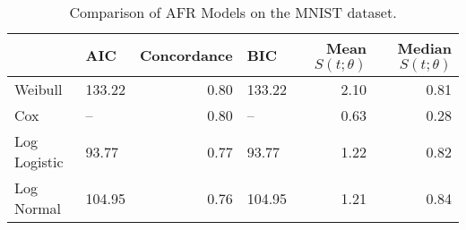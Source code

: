 \begin{table*}\n\centering
\caption{Comparison of AFR Models on the MNIST dataset.}
\label{tab:mnist}
\begin{tabular}{llrlrr}
\toprule
 & AIC & Concordance & BIC & Mean $S(t;\theta)$ & Median $S(t; \theta)$ \\
\midrule
Weibull & 133.22 & 0.80 & 133.22 & 2.10 & 0.81 \\
Cox & -- & 0.80 & -- & 0.63 & 0.28 \\
Log Logistic & 93.77 & 0.77 & 93.77 & 1.22 & 0.82 \\
Log Normal & 104.95 & 0.76 & 104.95 & 1.21 & 0.84 \\
\bottomrule
\end{tabular}
\end{table*}
